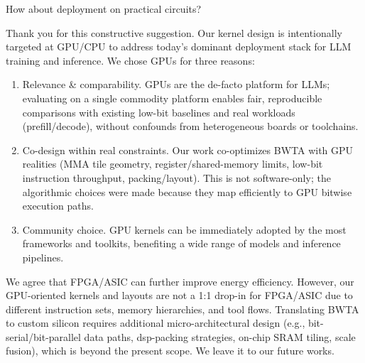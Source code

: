 \begin{revcommentToAssociateEditor}
How about deployment on practical circuits?
\end{revcommentToAssociateEditor}
\begin{revmeta}[]
Thank you for this constructive suggestion. Our kernel design is intentionally targeted at GPU/CPU to address today's dominant deployment stack for LLM training and inference. We chose GPUs for three reasons:
\begin{enumerate}
    \item Relevance \& comparability. GPUs are the de-facto platform for LLMs; evaluating on a single commodity platform enables fair, reproducible comparisons with existing low-bit baselines and real workloads (prefill/decode), without confounds from heterogeneous boards or toolchains.
    \item Co-design within real constraints. Our work co-optimizes BWTA with GPU realities (MMA tile geometry, register/shared-memory limits, low-bit instruction throughput, packing/layout). This is not software-only; the algorithmic choices were made because they map efficiently to GPU bitwise execution paths.  
    \item Community choice. GPU kernels can be immediately adopted by the most frameworks and toolkits, benefiting a wide range of models and inference pipelines. 
\end{enumerate}

We agree that FPGA/ASIC can further improve energy efficiency. However, our GPU-oriented kernels and layouts are not a 1:1 drop-in for FPGA/ASIC due to different instruction sets, memory hierarchies, and tool flows. Translating BWTA to custom silicon requires additional micro-architectural design (e.g., bit-serial/bit-parallel data paths, dsp-packing strategies, on-chip SRAM tiling, scale fusion), which is beyond the present scope. We leave it to our future works. 
\end{revmeta}


\clearpage
\printbibliography[heading=bibliography, title={References}, section=\therefsection]
\markboth{}{}
